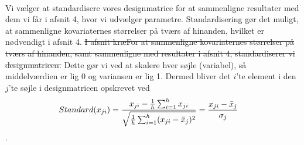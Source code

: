 \documentclass[11pt,a4paper]{article}
\begin{document}
\\ Vi vælger at standardisere vores designmatrice for at sammenligne resultater med dem vi får i afsnit 4, hvor vi udvælger parametre. Standardisering gør det muligt, at sammenligne kovariaternes størrelser på tværs af hinanden, hvilket er nødvendigt i afsnit 4. \sout{I afsnit kræFor at sammenligne kovariaternes størrelser på tværs af hinanden, samt sammenligne med resultater i afsnit 4, standardiserer vi designmatricen.} Dette gør vi ved at skalere hver søjle (variabel), så middelværdien er lig 0 og variansen er lig 1. Dermed bliver det $i$'te element i den $j$'te søjle i designmatricen opskrevet ved
\begin{align*}
    Standard(x_{ji}) &= \frac{x_{ji}-\frac{1}{h}\sum_{i=1}^h{x_{ji}}}{\sqrt{\frac{1}{h}\sum_{i=1}^h(x_{ji}-\Bar{x}_j)^2}}=\frac{x_{ji}-\Bar{x}_j}{\sigma_j}
\end{align*}.
\end{document}
